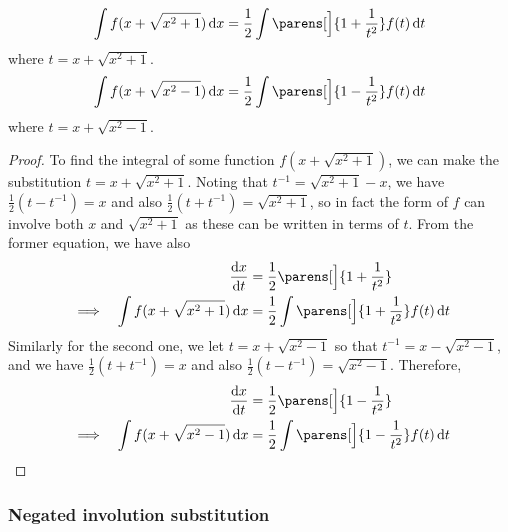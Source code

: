 \begin{theorem}
\begin{equation*}
    \integ{f(x + \sqrt{x^2 + 1})}{x}
    = \frac 12 \integ{\parens[\Big]{1 + \frac 1{t^2}}f(t)}{t}
\end{equation*}
where \(t = x + \sqrt{x^2 + 1}\).
\begin{equation*}
    \integ{f(x + \sqrt{x^2 - 1})}{x}
    = \frac 12 \integ{\parens[\Big]{1 - \frac 1{t^2}}f(t)}{t}
\end{equation*}
where \(t = x + \sqrt{x^2 - 1}\).
\end{theorem}
\begin{proof}
To find the integral of some function \(f(x + \sqrt{x^2 + 1})\), we can make
the substitution \(t = x + \sqrt{x^2 + 1}\). Noting that
\(t^{-1} = \sqrt{x^2 + 1} - x\), we have \(\frac 12(t - t^{-1}) = x\)
and also \(\frac 12(t + t^{-1}) = \sqrt{x^2 + 1}\), so in fact the form of
\(f\) can involve both \(x\) and \(\sqrt{x^2 + 1}\) as these can be
written in terms of \(t\). From the former equation, we have also
\begin{alignat*}{2}
    && \dv<x>{t} &= \frac 12\parens[\Big]{1 + \frac 1{t^2}} \\
    &\implies& \integ{f(x + \sqrt{x^2 + 1})}{x}
    &= \frac 12 \integ{\parens[\Big]{1 + \frac 1{t^2}}f(t)}{t}
\end{alignat*}
Similarly for the second one, we let \(t = x + \sqrt{x^2 - 1}\) so that
\(t^{-1} = x - \sqrt{x^2 - 1}\), and we have \(\frac 12(t + t^{-1}) = x\)
and also \(\frac 12(t - t^{-1}) = \sqrt{x^2 - 1}\). Therefore,
\begin{alignat*}{2}
    && \dv<x>{t} &= \frac 12\parens[\Big]{1 - \frac 1{t^2}} \\
    &\implies& \integ{f(x + \sqrt{x^2 - 1})}{x}
    &= \frac 12 \integ{\parens[\Big]{1 - \frac 1{t^2}}f(t)}{t} \qedhere
\end{alignat*}
\end{proof}

\subsubsection{Negated involution substitution}

